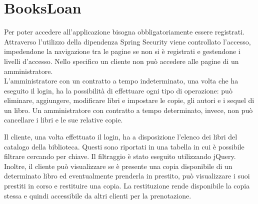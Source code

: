 \documentclass[a4paper,10pt]{article}
\begin{document}
\section*{BooksLoan}
Per poter accedere all’applicazione bisogna obbligatoriamente essere registrati. Attraverso l'utilizzo della dipendenza Spring Security viene controllato l'accesso, impedendone la navigazione tra le pagine se non si è registrati e gestendone i livelli d'accesso. Nello specifico un cliente non può accedere alle pagine di un amministratore.\\

\noindent L'amministratore con un contratto a tempo indeterminato, una volta che ha eseguito il login, ha la possibilità di effettuare ogni tipo di operazione: può eliminare, aggiungere, modificare libri e impostare le copie, gli autori e i sequel di un libro.
Un amministratore con contratto a tempo determinato, invece, non può cancellare i libri e le sue relative copie.

\noindent Il cliente, una volta effettuato il login, ha a disposizione l'elenco dei libri del catalogo della biblioteca. Questi sono riportati in una tabella in cui è possibile filtrare cercando per chiave. Il filtraggio è stato eseguito utilizzando jQuery. Inoltre, il cliente può visualizzare se è presente una copia disponibile di un determinato libro ed eventualmente prenderla in prestito, può visualizzare i suoi prestiti in corso e restituire una copia. La restituzione rende disponibile la copia stessa e quindi accessibile da altri clienti per la prenotazione.\\
\end{document}
